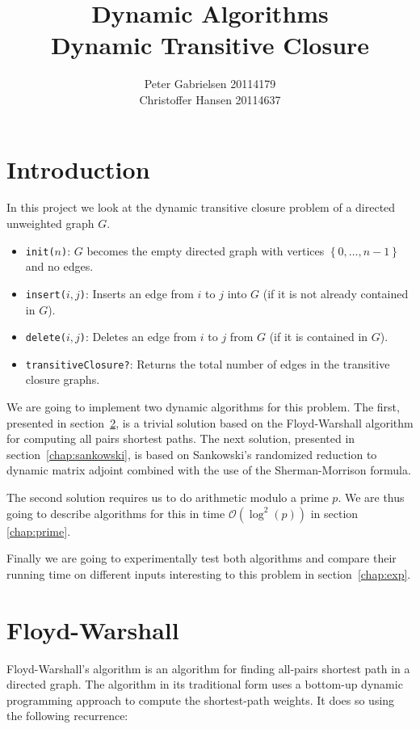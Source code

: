 \documentclass[a4paper,oneside,article,11pt]{memoir}
\title{Dynamic Algorithms \\ Dynamic Transitive Closure }
\author{Peter Gabrielsen 20114179 \\
Christoffer Hansen 20114637}
\begin{document}
\maketitle
\thispagestyle{empty}
\clearpage
\tableofcontents
\clearpage

\chapter{Introduction}
In this project we look at the dynamic transitive closure problem of a directed unweighted graph $G$.

\begin{itemize}
\item{\texttt{init($n$)}: $G$ becomes the empty directed graph with vertices $\left\lbrace 0,\dots, n-1\right\rbrace$ and no edges.}
\item{\texttt{insert($i,j$)}: Inserts an edge from $i$ to $j$ into $G$ (if it is not already contained in $G$).}
\item{\texttt{delete($i,j$)}: Deletes an edge from $i$ to $j$ from $G$ (if it is contained in $G$).}
\item{\texttt{transitiveClosure?}: Returns the total number of edges in the transitive closure graphs.}
\end{itemize}

We are going to implement two dynamic algorithms for this problem. The first, presented in section~\ref{chap:fw}, is a trivial solution based on the Floyd-Warshall algorithm for computing all pairs shortest paths. The next solution, presented in section~\ref{chap:sankowski}, is based on Sankowski's randomized reduction to dynamic matrix adjoint combined with the use of the Sherman-Morrison formula.

The second solution requires us to do arithmetic modulo a prime $p$. We are thus going to describe algorithms for this in time $\mathcal{O}(\log^2(p))$ in section \ref{chap:prime}.

Finally we are going to experimentally test both algorithms and compare their running time on different inputs interesting to this problem in section~\ref{chap:exp}.


\chapter{Floyd-Warshall}
\label{chap:fw}

Floyd-Warshall's algorithm is an algorithm for finding all-pairs shortest path in a directed graph. The algorithm in its traditional form uses a bottom-up dynamic programming approach to compute the shortest-path weights. It does so using the following recurrence:
\end{document}

